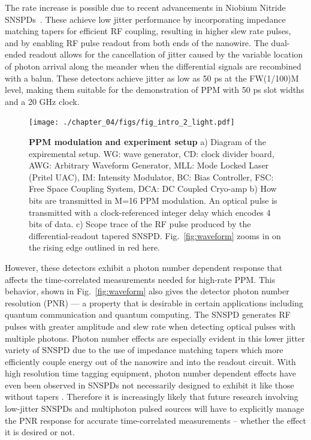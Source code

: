 \documentclass[11pt]{caltech_thesis} %
\begin{document}
The rate increase is possible due to recent advancements in Niobium Nitride SNSPDs~\autocite{Colangelo2023}. These achieve low jitter performance by incorporating impedance matching tapers for efficient RF coupling, resulting in higher slew rate pulses, and by enabling RF pulse readout from both ends of the nanowire. The dual-ended readout allows for the cancellation of jitter caused by the variable location of photon arrival along the meander when the differential signals are recombined with a balun. These detectors achieve jitter as low as 50 ps at the FW(1/100)M level, making them suitable for the demonstration of PPM with 50 ps slot widths and a 20 GHz clock.

\hypertarget{fig:intro}{%
\begin{figure}
\centering
\texttt{[image: ./chapter\_04/figs/fig\_intro\_2\_light.pdf]}
\caption[{PPM modulation and experiment setup}]{\textbf{PPM modulation and experiment setup} a) Diagram of the expiremental setup. WG: wave generator, CD: clock divider board, AWG: Arbitrary Waveform Generator, MLL: Mode Locked Laser (Pritel UAC), IM: Intensity Modulator, BC: Bias Controller, FSC: Free Space Coupling System, DCA: DC Coupled Cryo-amp b) How bits are transmitted in M=16 PPM modulation. An optical pulse is transmitted with a clock-referenced integer delay which encodes 4 bits of data. c) Scope trace of the RF pulse produced by the differential-readout tapered SNSPD. Fig.~\ref{fig:waveform} zooms in on the rising edge outlined in red here.}
\label{fig:intro}
\end{figure}
}

However, these detectors exhibit a photon number dependent response that affects the time-correlated measurements needed for high-rate PPM. This behavior, shown in Fig.~\ref{fig:waveform} also gives the detector photon number resolution (PNR) --- a property that is desirable in certain applications including quantum communication and quantum computing. The SNSPD generates RF pulses with greater amplitude and slew rate when detecting optical pulses with multiple photons. Photon number effects are especially evident in this lower jitter variety of SNSPD due to the use of impedance matching tapers which more efficiently couple energy out of the nanowire and into the readout circuit. With high resolution time tagging equipment, photon number dependent effects have even been observed in SNSPDs not necessarily designed to exhibit it \autocite{schapeler2023superconducting,sauer2023resolving} like those without tapers \autocite{Cahall2017SlewRatePNR}. Therefore it is increasingly likely that future research involving low-jitter SNSPDs and multiphoton pulsed sources will have to explicitly manage the PNR response for accurate time-correlated measurements -- whether the effect it is desired or not.
\end{document}
